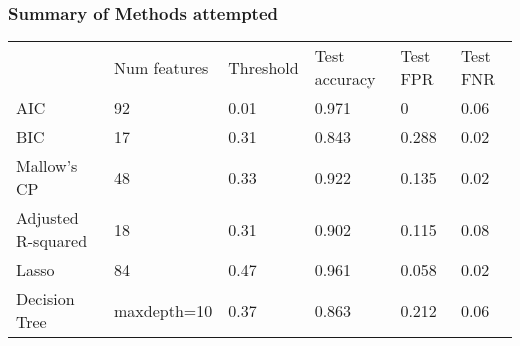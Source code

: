 \documentclass{article}
\begin{document}
\subsubsection{Summary of Methods attempted}
\begin{table}[H]
\begin{tabular}{llllll}
                   & Num features & Threshold & Test accuracy & Test FPR & Test FNR \\
AIC                & 92           & 0.01      & 0.971         & 0        & 0.06     \\
BIC                & 17           & 0.31      & 0.843         & 0.288    & 0.02     \\
Mallow's CP        & 48           & 0.33      & 0.922         & 0.135    & 0.02     \\
Adjusted R-squared & 18           & 0.31      & 0.902         & 0.115    & 0.08     \\
Lasso              & 84           & 0.47      & 0.961         & 0.058    & 0.02     \\
Decision Tree      & maxdepth=10  & 0.37      & 0.863         & 0.212    & 0.06
\end{tabular}
\end{table}
\end{document}
